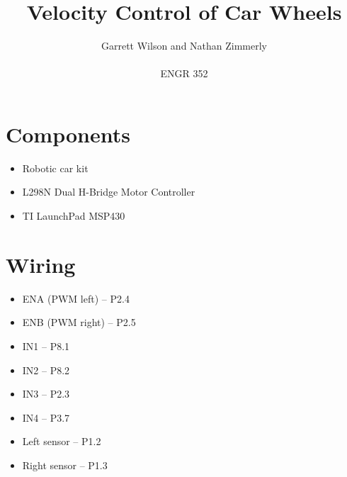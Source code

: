 \documentclass{article}
\begin{document}
\title{Velocity Control of Car Wheels}
\author{Garrett Wilson and Nathan Zimmerly \\ \\
ENGR 352}
\maketitle

\clearpage

\tableofcontents

\pagebreak

\section{Components}
\begin{itemize}
\item Robotic car kit
\item L298N Dual H-Bridge Motor Controller
\item TI LaunchPad MSP430
\end{itemize}

\section{Wiring}
\begin{itemize}
\item ENA (PWM left) -- P2.4
\item ENB (PWM right) -- P2.5
\item IN1 -- P8.1
\item IN2 -- P8.2
\item IN3 -- P2.3
\item IN4 -- P3.7
\item Left sensor -- P1.2
\item Right sensor -- P1.3
\end{itemize}
\end{document}
